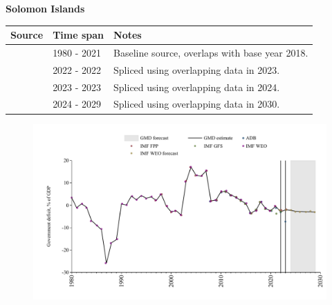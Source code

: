 \documentclass[12pt,a4paper,landscape]{article}
\begin{document}
\begin{adjustbox}{max totalsize={\paperwidth}{\paperheight},center}
\begin{minipage}[t][\textheight][t]{\textwidth}
\vspace*{0.5cm}
{}
\begin{center}
{\Large\bfseries Solomon Islands}
\end{center}
\vspace{0.5cm}
\begin{table}[H]
\centering
\small
\begin{tabular}{|l|l|l|}
\hline
\textbf{Source} & \textbf{Time span} & \textbf{Notes} \\
\hline
\rowcolor{white}\cite{IMF_WEO}& 1980 - 2021 &Baseline source, overlaps with base year 2018.\\
\rowcolor{lightgray}\cite{IMF_GFS}& 2022 - 2022 &Spliced using overlapping data in 2023.\\
\rowcolor{white}\cite{IMF_FPP}& 2023 - 2023 &Spliced using overlapping data in 2024.\\
\rowcolor{lightgray}\cite{IMF_WEO_forecast}& 2024 - 2029 &Spliced using overlapping data in 2030.\\
\hline
\end{tabular}
\end{table}
\begin{figure}[H]
\centering
\includegraphics[width=\textwidth,height=0.6\textheight,keepaspectratio]{graphs/SLB_govdef_GDP.pdf}
\end{figure}
\end{minipage}
\end{adjustbox}
\end{document}
